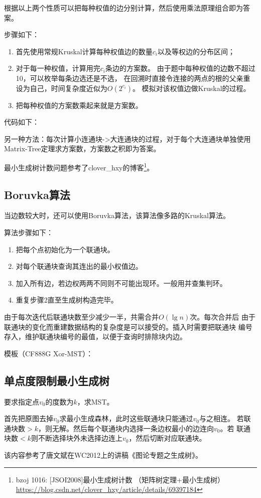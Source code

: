 根据以上两个性质可以把每种权值的边分别计算，然后使用乘法原理组合即为答案。

步骤如下：
\begin{enumerate}
	\item 首先使用常规Kruskal计算每种权值边的数量$c_i$以及等权边的分布区间；
	\item 对于每一种权值，计算用完$c_i$条边的方案数。
	      由于题中每种权值的边数不超过10，可以枚举每条边选还是不选，
          在回溯时直接令连接的两点的根的父亲重设为自己，时间复杂度近似为$O(2^{c_i})$。
          模拟对该权值边做Kruskal的过程。
	\item 把每种权值的方案数乘起来就是方案数。
\end{enumerate}

代码如下：


另一种方法：每次计算小连通块->大连通块的过程，对于每个大连通块单独使用
Matrix-Tree定理求方案数，方案数之积即为答案。

最小生成树计数问题参考了clover\_hxy的博客\footnote{
bzoj 1016: [JSOI2008]最小生成树计数 （矩阵树定理+最小生成树）
\url{https://blog.csdn.net/clover\_hxy/article/details/69397184}
}。
\subsection{Boruvka算法}
当边数较大时，还可以使用Boruvka算法，该算法像多路的Kruskal算法。

算法步骤如下：
\begin{enumerate}
    \item 把每个点初始化为一个联通块。
    \item 对每个联通块查询其连出的最小权值边。
    \item 加入所有边，若边权两两不同则不可能出现环。一般用并查集判环。
    \item 重复步骤2直至生成树构造完毕。
\end{enumerate}

由于每次迭代后联通块数至少减少一半，共需合并$O(\lg n)$次。每次合并后
由于联通块的变化而重建数据结构的复杂度是可以接受的。插入时需要把联通块
编号存入，维护联通块编号的最值，以便于查询时排除块内边。

模板（CF888G Xor-MST）：

\subsection{单点度限制最小生成树}
要求指定点$v_0$的度数为$k$，求MST。

首先把原图去掉$v_0$求最小生成森林，此时这些联通块只能通过$v_0$与之相连。
若联通块数$>k$，则无解。然后每个联通块内选择一条边权最小的边连向$v_0$。若
联通块数$<k$则不断选择块外未选择边连上$v_0$，然后切断对应联通块。

该内容参考了唐文斌在WC2012上的讲稿《图论专题之生成树》。
